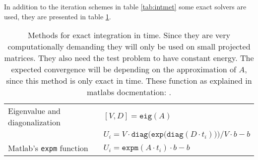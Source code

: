 In addition to the iteration schemes in table \ref{tab:intmet} some exact solvers are used, they are presented in table \ref{tab:intcorrect}.
\begin{table}
\begin{tabular}{l l}
Eigenvalue and diagonalization & $[V,D] = \texttt{eig}(A)$ \\
 & $U_i = V \cdot \texttt{diag} \Big( \texttt{exp} \big( \texttt{diag}(D \cdot t_i)\big)\Big)/V \cdot b - b$ \\
Matlab's \texttt{expm} function & $U_i = \texttt{expm}(A \cdot t_i) \cdot b - b$ \\

\end{tabular}
\caption{Methods for exact integration in time. Since they are very computationally demanding they will only be used on small projected matrices. They also need the test problem to have constant energy. The expected convergence will be depending on the approximation of $A$, since this method is only exact in time. These function as explained in matlabs docmentation: \cite{expm}. }
\label{tab:intcorrect} 
\end{table}


